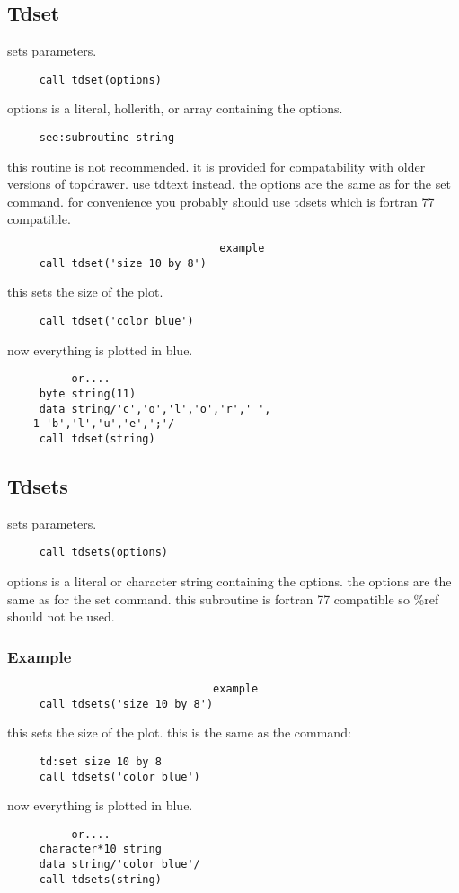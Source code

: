 \subsection{Tdset}
sets parameters.  
\begin{verbatim}
     call tdset(options) 
\end{verbatim}

options is a literal, hollerith, or array containing the options.  
\begin{verbatim}
     see:subroutine string 
\end{verbatim}
this  routine  is not recommended.  it is provided for compatability with
older versions of topdrawer.  use tdtext instead.  
the  options  are  the  same as for the set command.  for convenience you
probably should use tdsets which is fortran 77 compatible.  

\begin{verbatim}
                                 example
     call tdset('size 10 by 8') 
\end{verbatim}
this sets the size of the plot.  
\begin{verbatim}
     call tdset('color blue') 
\end{verbatim}
now everything is plotted in blue.  
\begin{verbatim}
          or....  
     byte string(11) 
     data string/'c','o','l','o','r',' ', 
    1 'b','l','u','e',';'/ 
     call tdset(string) 
\end{verbatim}
\subsection{Tdsets}
sets parameters.  
\begin{verbatim}
     call tdsets(options) 
\end{verbatim}

options  is  a  literal  or character string containing the options.  the
options are the same as for the set command.  this subroutine is  fortran
77 compatible so \%ref should not be used.  
\subsubsection{Example}
\begin{verbatim}
                                example
     call tdsets('size 10 by 8') 
\end{verbatim}
this sets the size of the plot.  this is the same as the command:  
\begin{verbatim}
     td:set size 10 by 8 
     call tdsets('color blue') 
\end{verbatim}
now everything is plotted in blue.  
\begin{verbatim}
          or....  
     character*10 string 
     data string/'color blue'/ 
     call tdsets(string) 
\end{verbatim}

